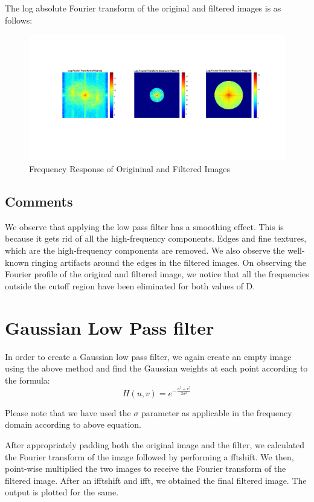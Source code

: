 \documentclass[a4paper]{article}
\begin{document}
The log absolute Fourier transform of the original and filtered images is as follows:
\begin{figure}[h]
    \centering
    \includegraphics[width=1\linewidth]{img2.png}
    \caption{Frequency Response of Origininal and Filtered Images}
\end{figure}

\subsection{Comments}
We observe that applying the low pass filter has a smoothing effect. This is because it gets rid of all the high-frequency components. Edges and fine textures, which are the high-frequency components are removed. We also observe the well-known ringing artifacts around the edges in the filtered images.
On observing the Fourier profile of the original and filtered image, we notice that all the frequencies outside the cutoff region have been eliminated for both values of D.


\section{Gaussian Low Pass filter}
In order to create a Gaussian low pass filter, we again create an empty image using the above method and find the Gaussian weights at each point according to the formula:
\[ H(u,v) = e^{-\frac{u^2 +v^2}{2\sigma^2}}\]

Please note that we have used the $\sigma$ parameter as applicable in the frequency domain according to above equation.
 
After appropriately padding both the original image and the filter, we calculated the Fourier transform of the image followed by performing a fftshift.
We then, point-wise multiplied the two images to receive the Fourier transform of the filtered image. After an ifftshift and ifft, we obtained the final filtered image. The output is plotted for the same.
\end{document}
